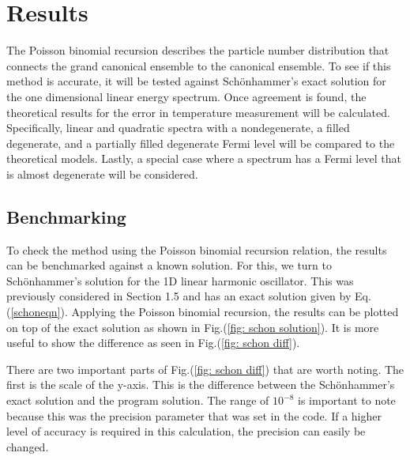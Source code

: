 \chapter{Results}\label{ch:cfd}
\begin{em}
The Poisson binomial recursion describes the particle number distribution that connects the grand canonical ensemble to the canonical ensemble. To see if this method is accurate, it will be tested  against Sch\"onhammer's exact solution for the one dimensional linear energy spectrum. Once agreement is found, the theoretical results for the error in temperature measurement will be calculated. Specifically, linear and quadratic spectra with a nondegenerate, a filled degenerate, and a partially filled degenerate Fermi level will be compared to the theoretical models. Lastly, a special case where a spectrum has a Fermi level that is almost degenerate will be considered.  
\end{em}

\section{Benchmarking}
To check the method using the Poisson binomial recursion relation, the results can be benchmarked against a known solution. For this, we turn to Sch\"onhammer's solution for the 1D linear harmonic oscillator. This was previously considered in Section 1.5 and has an exact solution given by Eq.\@ (\ref{schoneqn}). Applying the Poisson binomial recursion, the results can be plotted on top of the exact solution as shown in Fig.\@ (\ref{fig: schon solution}). It is more useful to show the difference as seen in Fig.\@ (\ref{fig: schon diff}). 

There are two important parts of Fig.\@ (\ref{fig: schon diff}) that are worth noting. The first is the scale of the y-axis. This is the difference between the Sch\"onhammer's exact solution and the program solution. The range of $10^{-8}$ is important to note because this was the precision parameter that was set in the code. If a higher level of accuracy is required in this calculation, the precision can easily be changed.  

